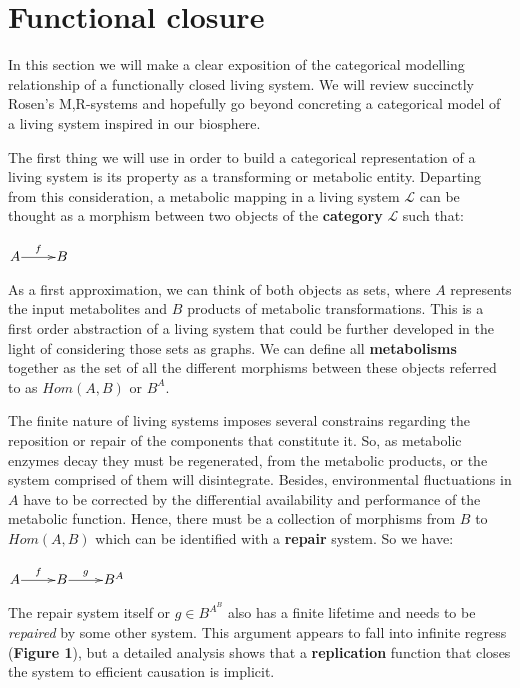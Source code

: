 \documentclass[aps,twocolumn]{revtex4-1}
\begin{document}
\section{Functional closure}

In this section we will make a clear exposition of the categorical modelling relationship of a functionally closed living system. We will review succinctly Rosen's M,R-systems and hopefully go beyond concreting a categorical model of a living system inspired in our biosphere.

The first thing we will use in order to build a categorical representation of a living system is its property as a transforming or metabolic entity. Departing from this consideration, a metabolic mapping in a living system $\mathcal{L}$ can be thought as a morphism between two objects of the \textbf{category} $\mathcal{L}$ such that:

\begin{center}
	$\xymatrix@1{
	A\ar[r]^-{f} & B
	}$

\end{center}

As a first approximation, we can think of both objects as sets, where $A$ represents the input metabolites and $B$  products of metabolic transformations. This is a first order abstraction of a living system that could be further developed in the light of considering those sets as graphs. We can define all \textbf{metabolisms} together as the set of all the different morphisms between these objects referred to as $Hom(A,B)$ or $B^A$.

The finite nature of living systems imposes several constrains regarding the reposition or repair of the components that constitute it. So, as metabolic enzymes decay they must be regenerated, from the metabolic products, or the system comprised of them will disintegrate. Besides, environmental fluctuations in $A$ have to be corrected by the differential availability and performance of the metabolic function. Hence, there must be a collection of morphisms from $B$ to $Hom(A,B)$ which can be identified with a \textbf{repair} system. So we have:


\begin{center}
	$
	\xymatrix@1{
	A\ar[r]^f &B\ar[r]^-g & B^A}
	$
\end{center}


 The repair system itself or $g \in B^{A^B}$ also has a finite lifetime and needs to be {\it repaired} by some other system. 
This argument appears to fall into infinite regress (\textbf{Figure 1}), but a detailed analysis shows that a \textbf{replication} function that closes the system to efficient causation is implicit.
\end{document}
